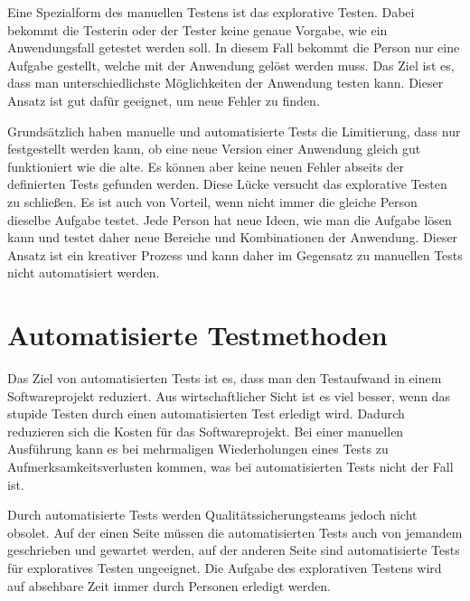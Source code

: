 
\SuperPar

Eine Spezialform des manuellen Testens ist das explorative Testen. Dabei bekommt die Testerin oder der Tester keine genaue Vorgabe, wie ein Anwendungsfall getestet werden soll. In diesem Fall bekommt die Person nur eine Aufgabe gestellt, welche mit der Anwendung gelöst werden muss. Das Ziel ist es, dass man unterschiedlichste Möglichkeiten der Anwendung testen kann. Dieser Ansatz ist gut dafür geeignet, um neue Fehler zu finden. 

\SuperPar
Grundsätzlich haben manuelle und automatisierte Tests die Limitierung, dass nur festgestellt werden kann, ob eine neue Version einer Anwendung gleich gut funktioniert wie die alte. Es können aber keine neuen Fehler abseits der definierten Tests gefunden werden. Diese Lücke versucht das explorative Testen zu schließen. Es ist auch von Vorteil, wenn nicht immer die gleiche Person dieselbe Aufgabe testet. Jede Person hat neue Ideen, wie man die Aufgabe lösen kann und testet daher neue Bereiche und Kombinationen der Anwendung. Dieser Ansatz ist ein kreativer Prozess und kann daher im Gegensatz zu manuellen Tests nicht automatisiert werden.

\section{Automatisierte Testmethoden}

Das Ziel von automatisierten Tests ist es, dass man den Testaufwand in einem Softwareprojekt reduziert. Aus wirtschaftlicher Sicht ist es viel besser, wenn das stupide Testen durch einen automatisierten Test erledigt wird. Dadurch reduzieren sich die Kosten für das Softwareprojekt. Bei einer manuellen Ausführung kann es bei mehrmaligen Wiederholungen eines Tests zu Aufmerksamkeitsverlusten kommen, was bei automatisierten Tests nicht der Fall ist.

\SuperPar
Durch automatisierte Tests werden Qualitätssicherungsteams jedoch nicht obsolet. Auf der einen Seite müssen die automatisierten Tests auch von jemandem geschrieben und gewartet werden, auf der anderen Seite sind automatisierte Tests für exploratives Testen ungeeignet. Die Aufgabe des explorativen Testens wird auf absehbare Zeit immer durch Personen erledigt werden.

